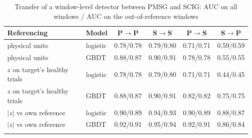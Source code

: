 \begin{table}[t]
\tabsize
\caption{Transfer of a window-level detector between PMSG and SCIG: AUC on all windows / AUC on the out-of-reference windows}\label{tab:transfer}
\begin{tabular}{@{}llcccc@{}}
\toprule
Referencing & Model & P$\to$P & S$\to$S & P$\to$S & S$\to$P \\
\midrule
physical units & logistic & 0.78/0.78 & 0.79/0.80 & 0.71/0.71 & 0.59/0.59 \\
physical units & GBDT & 0.88/0.87 & 0.90/0.91 & 0.78/0.78 & 0.55/0.55 \\
$z$ on target's healthy trials & logistic & 0.78/0.78 & 0.79/0.80 & 0.71/0.71 & 0.44/0.45 \\
$z$ on target's healthy trials & GBDT & 0.88/0.87 & 0.90/0.91 & 0.82/0.82 & 0.75/0.75 \\
$|z|$ vs own reference & logistic & 0.90/0.89 & 0.94/0.93 & 0.90/0.89 & 0.88/0.87 \\
$|z|$ vs own reference & GBDT & 0.92/0.91 & 0.95/0.94 & 0.92/0.91 & 0.86/0.84 \\
\botrule
\end{tabular}
\end{table}
